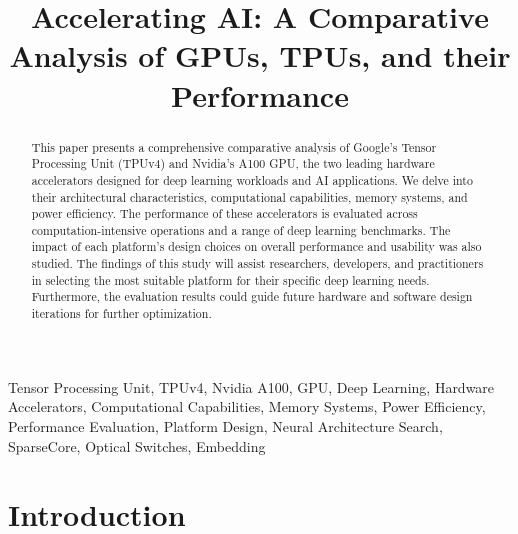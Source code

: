 \documentclass[conference]{IEEEtran}
\begin{document}
    \title{Accelerating AI: A Comparative Analysis of GPUs, TPUs, and their Performance}

    \author{
    }

    \maketitle

    \begin{abstract}
        This paper presents a comprehensive comparative analysis of Google's Tensor Processing Unit (TPUv4) and Nvidia's A100 GPU, the two leading hardware accelerators designed for deep learning workloads and AI applications.
        We delve into their architectural characteristics, computational capabilities, memory systems, and power efficiency.
        The performance of these accelerators is evaluated across computation-intensive operations and a range of deep learning benchmarks.
        The impact of each platform's design choices on overall performance and usability was also studied.
        The findings of this study will assist researchers, developers, and practitioners in selecting the most suitable platform for their specific deep learning needs.
        Furthermore, the evaluation results could guide future hardware and software design iterations for further optimization.
    \end{abstract}

    \begin{IEEEkeywords}
        Tensor Processing Unit, TPUv4, Nvidia A100, GPU, Deep Learning, Hardware Accelerators, Computational Capabilities, Memory Systems, Power Efficiency, Performance Evaluation, Platform Design, Neural Architecture Search, SparseCore, Optical Switches, Embedding
    \end{IEEEkeywords}


    \section{Introduction}
    \label{sec:introduction}
\end{document}
